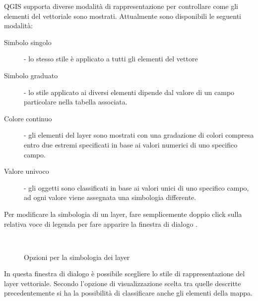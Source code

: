 QGIS supporta diverse modalità di rappresentazione per controllare come gli
elementi del vettoriale sono mostrati. Attualmente sono disponibili le
seguenti modalità:

\begin{description} 
    \item[Simbolo singolo] - lo stesso stile è applicato a tutti gli elementi del vettore
    \item[Simbolo graduato] - lo stile applicato ai diversi elementi dipende
    dal valore di un campo particolare nella tabella associata.
    \item[Colore continuo] - gli elementi del layer sono mostrati con una
    gradazione di colori compresa entro due estremi specificati in base ai valori numerici di uno specifico campo.
    \item[Valore univoco] - gli oggetti sono classificati in base ai valori
    unici di uno specifico campo, ad ogni valore viene assegnata una
    simbologia differente.
\end{description}

Per modificare la simbologia di un layer, fare semplicemente doppio click
sulla relativa voce di legenda per fare apparire la finestra di dialogo
.

\begin{figure}[h]
\centering
\caption{Opzioni per la simbologia dei layer \nixcaption}
   \goodgap
   \\
   \goodgap
\end{figure}


 \label{sec:style_options} 
In questa finestra di dialogo è possibile scegliere lo stile di
rappresentazione del layer vettoriale. Secondo l'opzione di visualizzazione
scelta tra quelle descritte precedentemente si ha la possibilità di
classificare anche gli elementi della mappa.

